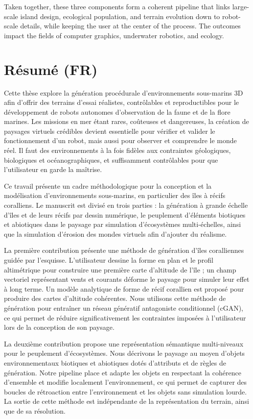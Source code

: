 Taken together, these three components form a coherent pipeline that links large-scale island design, ecological population, and terrain evolution down to robot-scale details, while keeping the user at the center of the process. The outcomes impact the fields of computer graphics, underwater robotics, and ecology.


\newpage
\section*{Résumé (FR)}
Cette thèse explore la génération procédurale d'environnements sous-marins 3D afin d'offrir des terrains d'essai réalistes, contrôlables et reproductibles pour le développement de robots autonomes d'observation de la faune et de la flore marines. Les missions en mer étant rares, coûteuses et dangereuses, la création de paysages virtuels crédibles devient essentielle pour vérifier et valider le fonctionnement d'un robot, mais aussi pour observer et comprendre le monde réel. Il faut des environnements à la fois fidèles aux contraintes géologiques, biologiques et océanographiques, et suffisamment contrôlables pour que l'utilisateur en garde la maîtrise.

Ce travail présente un cadre méthodologique pour la conception et la modélisation d'environnements sous-marins, en particulier des îles à récifs coralliens. Le manuscrit est divisé en trois parties : la génération à grande échelle d'îles et de leurs récifs par dessin numérique, le peuplement d'éléments biotiques et abiotiques dans le paysage par simulation d'écosystèmes multi-échelles, ainsi que la simulation d'érosion des mondes virtuels afin d'ajouter du réalisme.

La première contribution présente une méthode de génération d'îles coralliennes guidée par l'esquisse. L'utilisateur dessine la forme en plan et le profil altimétrique pour construire une première carte d'altitude de l'île ; un champ vectoriel représentant vents et courants déforme le paysage pour simuler leur effet à long terme. Un modèle analytique de forme de récif corallien est proposé pour produire des cartes d'altitude cohérentes. Nous utilisons cette méthode de génération pour entraîner un réseau génératif antagoniste conditionnel (cGAN), ce qui permet de réduire significativement les contraintes imposées à l'utilisateur lors de la conception de son paysage.

La deuxième contribution propose une représentation sémantique multi-niveaux pour le peuplement d'écosystèmes. Nous décrivons le paysage au moyen d'objets environnementaux biotiques et abiotiques dotés d'attributs et de règles de génération. Notre pipeline place et adapte les objets en respectant la cohérence d'ensemble et modifie localement l'environnement, ce qui permet de capturer des boucles de rétroaction entre l'environnement et les objets sans simulation lourde. La sortie de cette méthode est indépendante de la représentation du terrain, ainsi que de sa résolution.

